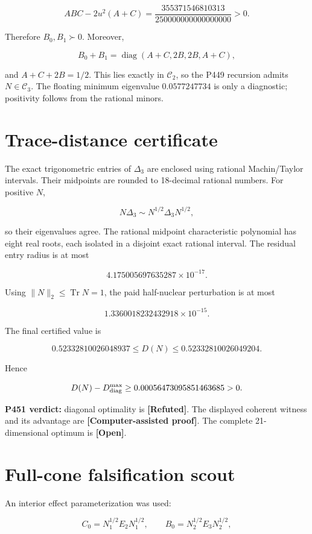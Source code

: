 \documentclass[11pt,a4paper,openany]{report}
\newcommand{\statusRefuted}{\textcolor{finred}{[Refuted]}}
\begin{document}
\[
ABC-2u^2(A+C)=
\frac{355371546810313}{250000000000000000}>0.
\]

Therefore \(B_0,B_1\succ0\). Moreover,

\[
B_0+B_1=
\operatorname{diag}(A+C,2B,2B,A+C),
\]

and \(A+C+2B=1/2\). This lies exactly in \(\mathcal C_2\), so the P449 recursion admits \(N\in\mathcal C_3\). The floating minimum eigenvalue \(0.0577247734\) is only a diagnostic; positivity follows from the rational minors.

\section{Trace-distance certificate}

The exact trigonometric entries of \(\Delta_3\) are enclosed using rational Machin/\allowbreak{}Taylor intervals. Their midpoints are rounded to 18-decimal rational numbers. For positive \(N\),

\[
N\Delta_3
\sim N^{1/2}\Delta_3N^{1/2},
\]

so their eigenvalues agree. The rational midpoint characteristic polynomial has eight real roots, each isolated in a disjoint exact rational interval. The residual entry radius is at most

\[
4.175005697635287\times10^{-17}.
\]

Using \(\lVert N\rVert_2\le\operatorname{Tr}N=1\), the paid half-nuclear perturbation is at most

\[
1.3360018232432918\times10^{-15}.
\]

The final certified value is

\[
0.52332810026048937
\le D(N)\le
0.52332810026049204.
\]

Hence

\[
D(N)-D_{\rm diag}^{\max}
\ge0.00056473095851463685>0.
\]

\textbf{P451 verdict:} diagonal optimality is \textbf{\statusRefuted{}}. The displayed coherent witness and its advantage are \textbf{\textcolor{fingreen}{[Computer-assisted proof]}}. The complete 21-dimensional optimum is \textbf{\textcolor{finorange}{[Open]}}.

\section{Full-cone falsification scout}

An interior effect parameterization was used:

\[
C_0=N_1^{1/2}E_2N_1^{1/2},\qquad
B_0=N_2^{1/2}E_3N_2^{1/2},
\]
\end{document}
